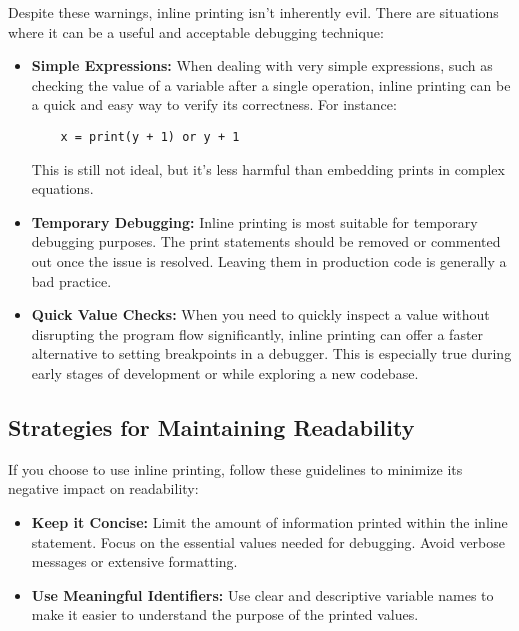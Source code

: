 \documentclass{article}
\begin{document}
{{{{Despite these warnings, inline printing isn't inherently evil.  There are situations where it can be a useful and acceptable debugging technique:

\begin{itemize}
    \item \textbf{Simple Expressions:} When dealing with very simple expressions, such as checking the value of a variable after a single operation, inline printing can be a quick and easy way to verify its correctness. For instance:
    \begin{verbatim}
    x = print(y + 1) or y + 1
    \end{verbatim}
    This is still not ideal, but it's less harmful than embedding prints in complex equations.

    \item \textbf{Temporary Debugging:} Inline printing is most suitable for temporary debugging purposes. The print statements should be removed or commented out once the issue is resolved.  Leaving them in production code is generally a bad practice.

    \item \textbf{Quick Value Checks:} When you need to quickly inspect a value without disrupting the program flow significantly, inline printing can offer a faster alternative to setting breakpoints in a debugger.  This is especially true during early stages of development or while exploring a new codebase.

\end{itemize}

\subsection*{Strategies for Maintaining Readability}

If you choose to use inline printing, follow these guidelines to minimize its negative impact on readability:

\begin{itemize}
    \item \textbf{Keep it Concise:} Limit the amount of information printed within the inline statement. Focus on the essential values needed for debugging. Avoid verbose messages or extensive formatting.

    \item \textbf{Use Meaningful Identifiers:} Use clear and descriptive variable names to make it easier to understand the purpose of the printed values.


\end{itemize}}}}}
\end{document}

